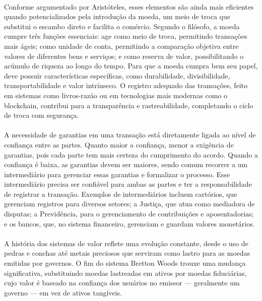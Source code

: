 \documentclass[letterpaper,11pt,leqno]{article}
\begin{document}
\paragraph{}
Conforme argumentado por Aristóteles, esses elementos são ainda mais eficientes
quando potencializados pela introdução da moeda, um meio de troca que substitui
o escambo direto e facilita o comércio. Segundo o filósofo, a moeda cumpre três
funções essenciais: age como meio de troca, permitindo transações mais ágeis;
como unidade de conta, permitindo a comparação objetiva entre valores de
diferentes bens e serviços; e como reserva de valor, possibilitando o acúmulo de
riqueza ao longo do tempo. Para que a moeda cumpra bem seu papel, deve possuir
características específicas, como durabilidade, divisibilidade,
transportabilidade e valor intrínseco. O registro adequado das transações, feito
em sistemas como livros-razão ou em tecnologias mais modernas como o blockchain,
contribui para a transparência e rastreabilidade, completando o ciclo de troca
com segurança.

\paragraph{}
A necessidade de garantias em uma transação está diretamente ligada ao nível de
confiança entre as partes. Quanto maior a confiança, menor a exigência de
garantias, pois cada parte tem mais certeza do cumprimento do acordo. Quando a
confiança é baixa, as garantias devem ser maiores, sendo comum recorrer a um
intermediário para gerenciar essas garantias e formalizar o processo. Esse
intermediário precisa ser confiável para ambas as partes e ter a
responsabilidade de registrar a transação. Exemplos de intermediários incluem
cartórios, que gerenciam registros para diversos setores; a Justiça, que atua
como mediadora de disputas; a Previdência, para o gerenciamento de contribuições
e aposentadorias; e os bancos, que, no sistema financeiro, gerenciam e guardam
valores monetários.

\paragraph{}
A história dos sistemas de valor reflete uma evolução constante, desde o uso de
pedras e conchas até metais preciosos que serviram como lastro para as moedas
emitidas por governos. O fim do sistema Bretton Woods trouxe uma mudança
significativa, substituindo moedas lastreadas em ativos por moedas fiduciárias,
cujo valor é baseado na confiança dos usuários no emissor — geralmente um
governo — em vez de ativos tangíveis.
\end{document}
